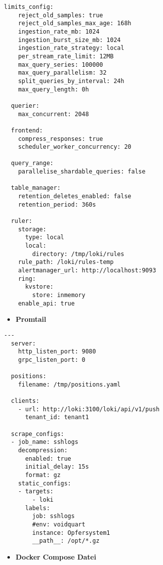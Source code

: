 {\begin{Verbatim}[frame=single]
  limits_config:
    reject_old_samples: true
    reject_old_samples_max_age: 168h
    ingestion_rate_mb: 1024
    ingestion_burst_size_mb: 1024
    ingestion_rate_strategy: local
    per_stream_rate_limit: 12MB
    max_query_series: 100000
    max_query_parallelism: 32
    split_queries_by_interval: 24h
    max_query_length: 0h
  
  querier:
    max_concurrent: 2048
  
  frontend:
    compress_responses: true
    scheduler_worker_concurrency: 20
  
  query_range:
    parallelise_shardable_queries: false
  
  table_manager:
    retention_deletes_enabled: false
    retention_period: 360s
  
  ruler:
    storage:
      type: local
      local:
        directory: /tmp/loki/rules
    rule_path: /loki/rules-temp
    alertmanager_url: http://localhost:9093
    ring:
      kvstore:
        store: inmemory
    enable_api: true
\end{Verbatim}
}

\begin{itemize}[noitemsep]
    \item \textbf{Promtail} 
\end{itemize}

{
\begin{Verbatim}[frame=single]
  ---
  server:
    http_listen_port: 9080
    grpc_listen_port: 0
  
  positions:
    filename: /tmp/positions.yaml
  
  clients:
    - url: http://loki:3100/loki/api/v1/push
      tenant_id: tenant1
  
  scrape_configs:
  - job_name: sshlogs
    decompression:
      enabled: true
      initial_delay: 15s
      format: gz
    static_configs:
    - targets:
        - loki
      labels:
        job: sshlogs
        #env: voidquart
        instance: Opfersystem1
        __path__: /opt/*.gz 
\end{Verbatim}
}

\newpage
\begin{itemize}[noitemsep]
    \item \textbf{Docker Compose Datei} 
\end{itemize}

